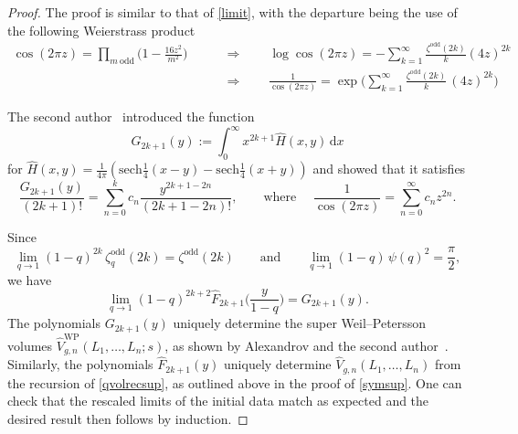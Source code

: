 \documentclass[a4paper]{article}
\theoremstyle{plain}
\theoremstyle{definition}
\newcommand{\dd}{\mathrm{d}}
\begin{document}
\begin{proof}
The proof is similar to that of \cref{limit}, with the departure being the use of the following Weierstrass product %
\begin{align*}
\cos(2\pi z)=\prod_{m~\mathrm{odd}} \bigg( 1-\frac{16z^2}{m^2} \bigg) \qquad &\Rightarrow \qquad \log\cos(2\pi z)=-\sum_{k=1}^\infty \frac{\zeta^{\mathrm{odd}}(2k)}{k} (4z)^{2k} \\
&\Rightarrow \qquad \frac{1}{\cos(2\pi z)} = \exp \bigg( \sum_{k=1}^\infty \frac{\zeta^{\mathrm{odd}}(2k)}{k} \, (4z)^{2k}\bigg)
\end{align*}


The second author~\cite[Lemma 5.2]{NorEnu} introduced the function
\[
G_{2k+1}(y):=\int_0^\infty \!\! x^{2k+1}\widehat{H}(x,y) \, \dd x
\]
for $\widehat{H}(x,y)=\frac{1}{4\pi}\left(\mathrm{sech}\frac14(x-y)-\mathrm{sech}\frac14(x+y)\right)$
and showed that it satisfies
\[
\frac{G_{2k+1}(y)}{(2k+1)!} = \sum_{n=0}^{k} c_n \frac{y^{2k+1-2n}}{(2k+1-2n)!}, \qquad \text{where } \quad\frac{1}{\cos(2\pi z)}=\sum_{n=0}^\infty c_n z^{2n}.
\]


Since
\[
\lim_{q \to 1} (1-q)^{2k} \, \zeta^{\mathrm{odd}}_q(2k) = \zeta^{\mathrm{odd}}(2k) \qquad \text{and} \qquad \lim_{q \to 1} (1-q) \, \psi(q)^2 = \frac{\pi}{2},
\]
we have
\[
\lim_{q\to 1}(1-q)^{2k+2}\widehat{F}_{2k+1}\Big(\frac{y}{1-q}\Big)=G_{2k+1}(y).
\]
The polynomials $G_{2k+1}(y)$ uniquely determine the super Weil--Petersson volumes $\widehat{V}^{\mathrm{WP}}_{g,n}(L_1, \ldots, L_n;s)$, as shown by Alexandrov and the second author~\cite{ANoSup}. Similarly, the polynomials $\widehat{F}_{2k+1}(y)$ uniquely determine  $\widehat{V}_{g,n}(L_1, \ldots, L_n)$ from the recursion of \cref{qvolrecsup}, as outlined above in the proof of \cref{symsup}. One can check that the rescaled limits of the initial data match as expected and the desired result then follows by induction.
\end{proof}





\end{document}

